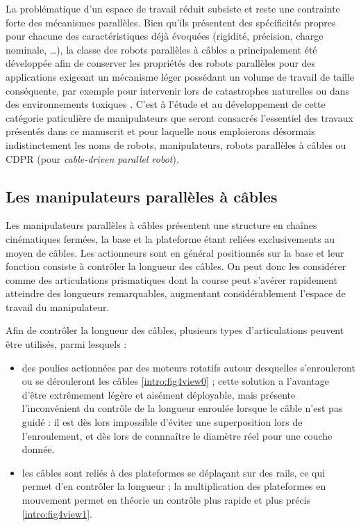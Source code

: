 La problématique d'un espace de travail réduit subsiste et reste une contrainte forte des mécanismes parallèles. Bien qu'ils présentent des spécificités propres pour chacune des caractéristiques déjà évoquées (rigidité, précision, charge nominale, \dots), la classe des robots parallèles à câbles a principalement été développée afin de conserver les propriétés des robots parallèles pour des applications exigeant un mécanisme léger possédant un volume de travail de taille conséquente, par exemple pour intervenir lors de catastrophes naturelles ou dans des environnements toxiques \cite{1992:Albus.Bostelman.ea}. C'est à l'étude et au développement de cette catégorie paticulière de manipulateurs que seront consacrés l'essentiel des travaux présentés dans ce manuscrit et pour laquelle nous emploierons désormais indistinctement les noms de robots, manipulateurs, robots parallèles à câbles ou CDPR (pour {\it cable-driven parallel robot}).

\subsection{Les manipulateurs parallèles à câbles}

Les manipulateurs parallèles à câbles présentent une structure en chaînes cinématiques fermées, la base et la plateforme étant reliées exclusivements au moyen de câbles. Les actionneurs sont en général positionnés sur la base et leur fonction consiste à contrôler la longueur des câbles. On peut donc les considérer comme des articulations prismatiques dont la course peut s'avérer rapidement atteindre des longueurs remarquables, augmentant considérablement l'espace de travail du manipulateur.

Afin de contrôler la longueur des câbles, plusieurs types d'articulations peuvent être utilisés, parmi lesquels :
\begin{itemize}
 \item des poulies actionnées par des moteurs rotatifs autour desquelles s'enrouleront ou se dérouleront les câbles \ref{intro:fig4view0} ; cette solution a l'avantage d'être extrêmement légère et aisément déployable, mais présente l'inconvénient du contrôle de la longueur enroulée lorsque le câble n'est pas guidé : il est dès lors impossible d'éviter une superposition lors de l'enroulement, et dès lors de connnaître le diamètre réel pour une couche donnée.
 \item les câbles sont reliés à des plateformes se déplaçant sur des rails, ce qui permet d'en contrôler la longueur \cite{merlet2008} ; la multiplication des plateformes en mouvement permet en théorie un contrôle plus rapide et plus précis \ref{intro:fig4view1}. 
\end{itemize}

